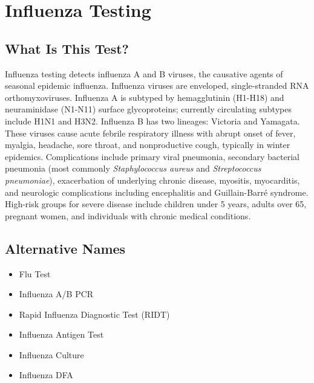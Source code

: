\chapter{Influenza Testing}

\section*{What Is This Test?}
Influenza testing detects influenza A and B viruses, the causative agents of seasonal epidemic influenza. Influenza viruses are enveloped, single-stranded RNA orthomyxoviruses. Influenza A is subtyped by hemagglutinin (H1-H18) and neuraminidase (N1-N11) surface glycoproteins; currently circulating subtypes include H1N1 and H3N2. Influenza B has two lineages: Victoria and Yamagata. These viruses cause acute febrile respiratory illness with abrupt onset of fever, myalgia, headache, sore throat, and nonproductive cough, typically in winter epidemics. Complications include primary viral pneumonia, secondary bacterial pneumonia (most commonly \textit{Staphylococcus aureus} and \textit{Streptococcus pneumoniae}), exacerbation of underlying chronic disease, myositis, myocarditis, and neurologic complications including encephalitis and Guillain-Barré syndrome. High-risk groups for severe disease include children under 5 years, adults over 65, pregnant women, and individuals with chronic medical conditions.

\section*{Alternative Names}
\begin{itemize}
  \item Flu Test
  \item Influenza A/B PCR
  \item Rapid Influenza Diagnostic Test (RIDT)
  \item Influenza Antigen Test
  \item Influenza Culture
  \item Influenza DFA
\end{itemize}
